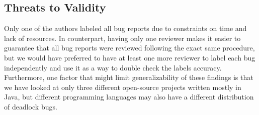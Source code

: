 \subsection{Threats to Validity}

Only one of the authors labeled all bug reports due to constraints on time and lack of resources. In counterpart, having only one reviewer makes it easier to guarantee that all bug reports were reviewed following the exact same procedure, but we would have preferred to have at least one more reviewer to label each bug independently and use it as a way to double check the labels accuracy. Furthermore, one factor that might limit generalizability of these findings is that we have looked at only three different open-source projects written mostly in Java, but different programming languages may also have a different distribution of deadlock bugs.
